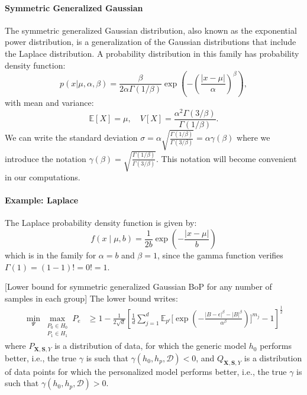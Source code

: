 \paragraph{Symmetric Generalized Gaussian} The symmetric generalized Gaussian distribution, also known as the exponential power distribution, is a generalization of the Gaussian distributions that include the Laplace distribution. A probability distribution in this family has probability density function:
\begin{equation}
p(x | \mu, \alpha, \beta ) = 
    \frac {\beta }{2\alpha \Gamma (1/\beta )}
    \exp\left(-\left(\frac{|x-\mu |}{\alpha }\right)^\beta\right),
\end{equation}
with mean and variance:
\begin{equation}
    \mathbb{E}[X] = \mu, \quad V[X] = \frac {\alpha ^{2}\Gamma (3/\beta )}{\Gamma (1/\beta )}.
\end{equation}
We can write the standard deviation $\sigma = \alpha\sqrt{\frac{\Gamma(1/\beta)}{\Gamma(3/\beta)}}=\alpha\gamma(\beta)$ where we introduce the notation $\gamma(\beta) = \sqrt{\frac{\Gamma(1/\beta)}{\Gamma(3/\beta)}}$. This notation will become convenient in our computations.

\paragraph{Example: Laplace} The Laplace probability density function is given by:
\begin{equation}
    f(x\mid \mu ,b)
        =\frac{1}{2b}
        \exp \left(-\frac {|x-\mu |}{b}\right)
\end{equation}
which is in the family for $\alpha = b $ and $\beta = 1$, since the gamma function verifies $\Gamma(1) = (1-1)! = 0!= 1$.

\begin{proposition}\label{prop:lower-bound-gaussian}[Lower bound for symmetric generalized Gaussian BoP for any number of samples in each group]
The lower bound writes:
\begin{align*}
      \min _{\Psi} 
    \max _{\substack{P_0 \in H_0 \\ P_1 \in H_1}}
        P_e 
        &\geq 1 - \frac{1}{2\sqrt{d}}\left[
             \frac{1}{d}
            \sum_{j=1}^d \mathbb{E}_{p^\epsilon}\Bigg[
            \exp\left(-
            \frac{|B - \epsilon|^\beta-|B|^\beta}{\alpha^\beta}
            \right)\Bigg]^{m_j}
            -1
            \right]^{\frac{1}{2}}
\end{align*}
where $P_{\mathbf{X}, \mathbf{S}, Y}$ is a distribution of data, for which the generic model $h_0$ performs better, i.e., the true $\gamma$ is such that $\gamma(h_0, h_p, \mathcal{D}) < 0$, and $Q_{\mathbf{X}, \mathbf{S}, Y}$ is a distribution of data points for which the personalized model performs better, i.e., the true $\gamma$ is such that $\gamma(h_0, h_p, \mathcal{D}) > 0$.
\end{proposition}

